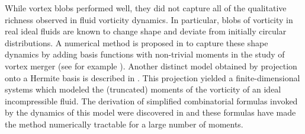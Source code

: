 \documentclass[12pt]{amsart}
\theoremstyle{remark}
\begin{document}
While vortex blobs performed well, they did not capture all of the qualitative richness observed in fluid vorticity dynamics.
In particular, blobs of vorticity in real ideal fluids are known to change shape and deviate from initially circular distributions.
A numerical method is proposed in \cite{Rossi1997,Rossi2005} to capture these shape dynamics by adding
basis functions with non-trivial moments in the study of vortex merger (see for example \cite{MelanderZabuskyMcWilliams1998,DizesVerga2002,MeunierDizesLeweke2005}).
Another distinct model obtained by projection onto a Hermite basis is described in \cite{NagemSandriUminskyWayne2009}.
This projection yielded a finite-dimensional systems which modeled the (truncated) moments of the vorticity of an ideal incompressible fluid.
The derivation of simplified combinatorial formulas invoked by the dynamics of this model were discovered in \cite{UminskyWayneBarbaro2010}
and these formulas have made the method numerically tractable for a large number of moments.
\end{document}
